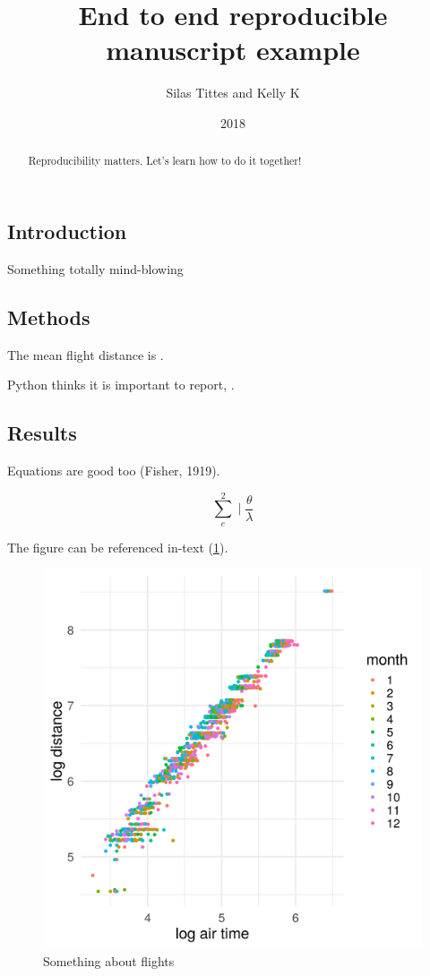 \documentclass[12pt,a4paper,]{article}
\title{End to end reproducible manuscript example}
\author{Silas Tittes and Kelly K}
\date{2018}
\begin{document}
\maketitle
\begin{abstract}
Reproducibility matters. Let's learn how to do it together!
\end{abstract}

\subsection{Introduction}\label{introduction}

Something totally mind-blowing

\subsection{Methods}\label{methods}

The mean flight distance is \meandistance{}.

\noindent
Python thinks it is important to report, \pyvar{}.

\subsection{Results}\label{results}

Equations are good too (Fisher, 1919).

\[\sum_{e}^{2} \mid \frac{\theta}{\lambda}\]

The figure can be referenced in-text (\ref{fig:flight}).

\begin{figure}
\centering
\includegraphics{flight.png}
\caption{Something about flights\label{fig:flight}}
\end{figure}
\end{document}
